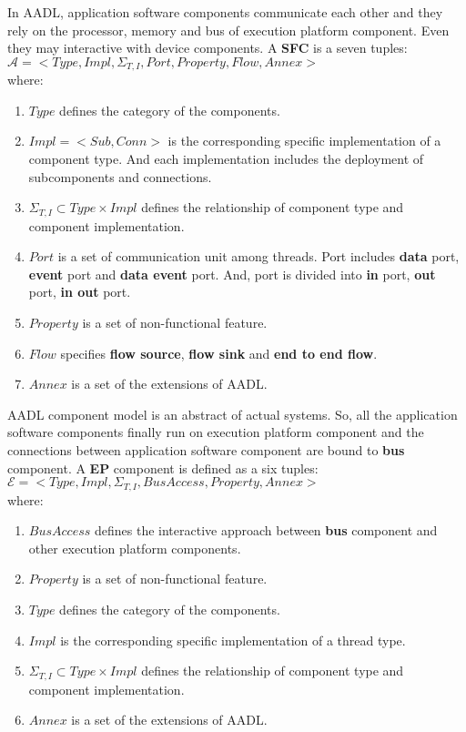 In AADL, application software components communicate each other and they rely on the processor, memory and bus of execution platform component. Even they may interactive with device components. 
 A \textbf{SFC} is a seven tuples:\\ $\mathcal{A} = <Type, Impl, \Sigma_{T, I}, Port, Property, Flow,  Annex>$ \\where:
\begin{enumerate}
\item $Type$ defines the category of the components. 
\item $Impl = <Sub, Conn>$ is the corresponding specific implementation of a component type. And each implementation includes the deployment of subcomponents and connections.
\item $\Sigma_{T, I}\subset Type\times Impl$ defines the relationship of component type and component implementation.
\item $Port$ is a set of communication unit among threads. Port includes \textbf{data} port, \textbf{event} port and \textbf{data event} port. And, port is divided into \textbf{in} port, \textbf{out} port, \textbf{in out} port.
\item $Property$ is a set of non-functional feature.
\item $Flow$ specifies \textbf{flow source}, \textbf{flow sink} and \textbf{end to end flow}. 
\item $Annex$ is a set of the extensions of AADL.
\end{enumerate}


AADL component model is an abstract of actual systems. So, all the application software components finally run on execution platform component and the connections between application software component are bound to \textbf{bus} component.  
 A \textbf{EP} component is defined as a six tuples:\\ $\mathcal{E} = <Type, Impl, \Sigma_{T, I}, BusAccess, Property, Annex>$ \\where: 
\begin{enumerate}
\item $BusAccess$ defines the interactive approach between \textbf{bus} component and other execution platform components.
\item $Property$ is a set of non-functional feature.
\item $Type$ defines the category of the components. 
\item $Impl$ is the corresponding specific implementation of a thread type.
\item $\Sigma_{T, I}\subset Type\times Impl$ defines the relationship of component type and component implementation.
\item $Annex$ is a set of the extensions of AADL.
\end{enumerate}


